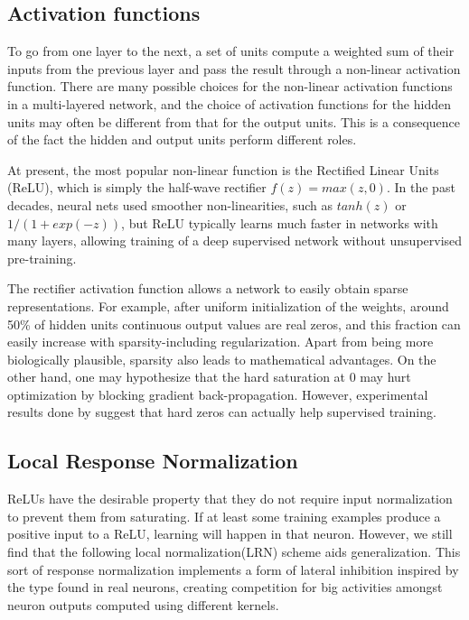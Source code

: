 \subsection{Activation functions}
\label{sec:actfun}
To go from one layer to the next, a set of units compute a weighted sum of their inputs from the previous layer and pass the result through a non-linear activation function\cite{lecun2015deep}. There are many possible choices for the non-linear activation functions in a multi-layered network, and the choice of activation functions for the hidden units may often be different from that for the output units. This is a consequence of the fact the hidden and output units perform different roles\cite{bishop1995neural}. 

\indent At present, the most popular non-linear function is the Rectified Linear Units (ReLU), which is simply the half-wave rectifier $f(z) = max(z, 0)$. In the past decades, neural nets used smoother non-linearities, such as $tanh(z)$ or $1/(1+ exp(-z))$, but ReLU typically learns much faster in networks with many layers, allowing training of a deep supervised network without unsupervised pre-training\cite{lecun2015deep}. 

\indent The rectifier activation function allows a network to easily obtain sparse representations. For example, after uniform initialization of the weights, around 50\% of hidden units continuous output values are real zeros, and this fraction can easily increase with sparsity-including regularization. Apart from being more biologically plausible, sparsity also leads to mathematical advantages. On the other hand, one may hypothesize that the hard saturation at 0 may hurt optimization by blocking gradient back-propagation. However, experimental results done by\citeauthor{glorot2011deep} suggest that hard zeros can actually help supervised training\cite{glorot2011deep}.  

\subsection{Local Response Normalization}

ReLUs have the desirable property that they do not require input normalization to prevent them from saturating. If at least some training examples produce a positive input to a ReLU, learning will happen in that neuron. However, we still find that the following local normalization(LRN) scheme aids generalization. This sort of response normalization implements a form of lateral inhibition  inspired by the type found in real neurons, creating competition for big activities amongst neuron outputs computed using different kernels\cite{krizhevsky2012imagenet}.

